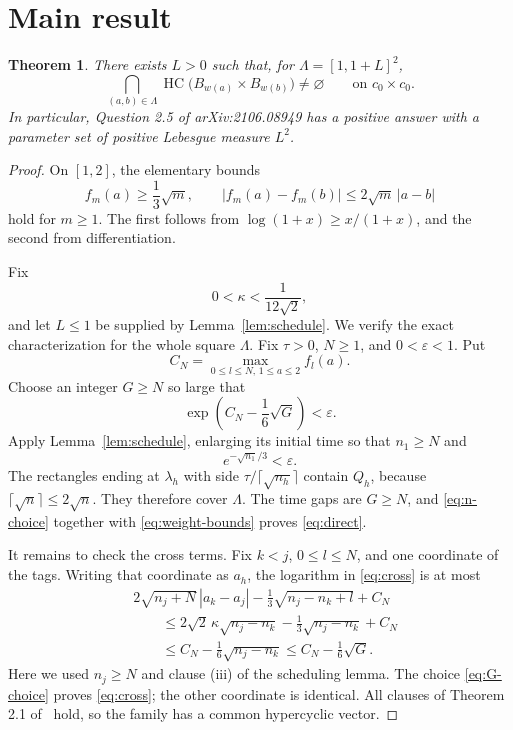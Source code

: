 \documentclass[11pt]{article}
\newtheorem{theorem}{Theorem}
\newcommand{\HC}{\operatorname{HC}}
\begin{document}
\section*{Main result}

\begin{theorem}\label{thm:main}
There exists \(L>0\) such that, for
\(\Lambda=[1,1+L]^2\),
\[
 \bigcap_{(a,b)\in\Lambda}
 \HC\bigl(B_{w(a)}\times B_{w(b)}\bigr)\neq\varnothing
 \qquad\text{on }c_0\times c_0.
\]
In particular, Question 2.5 of arXiv:2106.08949 has a positive answer with a
parameter set of positive Lebesgue measure \(L^2\).
\end{theorem}

\begin{proof}
On \([1,2]\), the elementary bounds
\begin{equation}
 f_m(a)\geq\frac13\sqrt m,
 \qquad
 |f_m(a)-f_m(b)|\leq2\sqrt m\,|a-b|
 \label{eq:weight-bounds}
\end{equation}
hold for \(m\geq1\).  The first follows from
\(\log(1+x)\geq x/(1+x)\), and the second from differentiation.

Fix
\[
 0<\kappa<\frac1{12\sqrt2},
\]
and let \(L\leq1\) be supplied by Lemma~\ref{lem:schedule}.  We verify the
exact characterization for the whole square \(\Lambda\).  Fix
\(\tau>0\), \(N\geq1\), and \(0<\varepsilon<1\).  Put
\[
 C_N=\max_{0\leq l\leq N,\,1\leq a\leq2} f_l(a).
\]
Choose an integer \(G\geq N\) so large that
\begin{equation}
 \exp\left(C_N-\frac16\sqrt G\right)<\varepsilon.
 \label{eq:G-choice}
\end{equation}
Apply Lemma~\ref{lem:schedule}, enlarging its initial time so that
\(n_1\geq N\) and
\begin{equation}
 e^{-\sqrt{n_1}/3}<\varepsilon.
 \label{eq:n-choice}
\end{equation}
The rectangles ending at \(\lambda_h\) with side
\(\tau/\lceil\sqrt{n_h}\rceil\) contain \(Q_h\), because
\(\lceil\sqrt n\rceil\leq2\sqrt n\).  They therefore cover \(\Lambda\).
The time gaps are \(G\geq N\), and \eqref{eq:n-choice} together with
\eqref{eq:weight-bounds} proves \eqref{eq:direct}.

It remains to check the cross terms.  Fix \(k<j\), \(0\leq l\leq N\), and
one coordinate of the tags.  Writing that coordinate as \(a_h\), the
logarithm in \eqref{eq:cross} is at most
\begin{align*}
 &2\sqrt{n_j+N}\,|a_k-a_j|
 -\frac13\sqrt{n_j-n_k+l}+C_N\\
 &\qquad\leq
 2\sqrt2\,\kappa\sqrt{n_j-n_k}
 -\frac13\sqrt{n_j-n_k}+C_N\\
 &\qquad\leq C_N-\frac16\sqrt{n_j-n_k}
 \leq C_N-\frac16\sqrt G.
\end{align*}
Here we used \(n_j\geq N\) and clause (iii) of the scheduling lemma.  The
choice \eqref{eq:G-choice} proves \eqref{eq:cross}; the other coordinate is
identical.  All clauses of Theorem 2.1 of~\cite{BayartCostaMenet} hold, so the
family has a common hypercyclic vector.
\end{proof}
\end{document}
